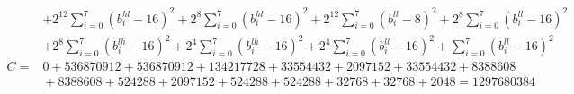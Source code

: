 \documentclass[fleqn]{article}
\begin{document}
\[{\begin{aligned}
  & + 2^{12}\!\sum_{i=0}^{7}(b_i^{hl}{-}16)^2 + 2^{8}\!\sum_{i=0}^{7}(b_i^{hl}{-}16)^2 + 2^{12}\!\sum_{i=0}^{7}(b_i^{ll}{-}8)^2 + 2^{8}\!\sum_{i=0}^{7}(b_i^{ll}{-}16)^2 \\
  & + 2^{8}\!\sum_{i=0}^{7}(b_i^{lh}{-}16)^2 + 2^{4}\!\sum_{i=0}^{7}(b_i^{lh}{-}16)^2 + 2^{4}\!\sum_{i=0}^{7}(b_i^{ll}{-}16)^2 + \sum_{i=0}^{7}(b_i^{ll}{-}16)^2 \\[0.5em]
C ={}& 0 + 536870912 + 536870912 + 134217728 + 33554432 + 2097152 + 33554432 + 8388608 \\
  & {}+ 8388608 + 524288 + 2097152 + 524288 + 524288 + 32768 + 32768 + 2048 = 1297680384
\end{aligned}
\;}
\]
\end{document}
